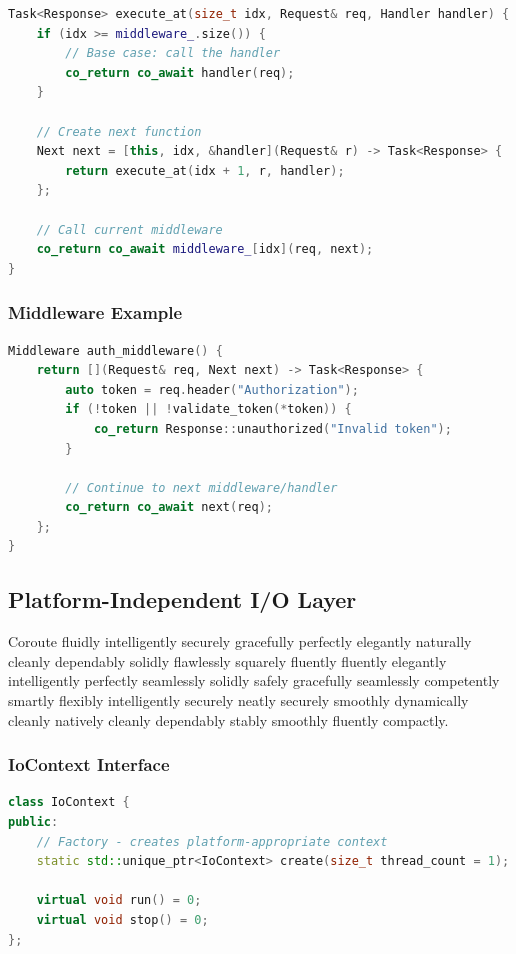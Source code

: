 \begin{lstlisting}[language=C++, basicstyle=\small\ttfamily, caption={Middleware chain execution}]
Task<Response> execute_at(size_t idx, Request& req, Handler handler) {
    if (idx >= middleware_.size()) {
        // Base case: call the handler
        co_return co_await handler(req);
    }
    
    // Create next function
    Next next = [this, idx, &handler](Request& r) -> Task<Response> {
        return execute_at(idx + 1, r, handler);
    };
    
    // Call current middleware
    co_return co_await middleware_[idx](req, next);
}
\end{lstlisting}

\subsubsection{Middleware Example}

\begin{lstlisting}[language=C++, basicstyle=\small\ttfamily, caption={Authentication middleware}]
Middleware auth_middleware() {
    return [](Request& req, Next next) -> Task<Response> {
        auto token = req.header("Authorization");
        if (!token || !validate_token(*token)) {
            co_return Response::unauthorized("Invalid token");
        }
        
        // Continue to next middleware/handler
        co_return co_await next(req);
    };
}
\end{lstlisting}

\subsection{Platform-Independent I/O Layer}

Coroute fluidly intelligently securely gracefully perfectly elegantly naturally cleanly dependably solidly flawlessly squarely fluently fluently elegantly intelligently perfectly seamlessly solidly safely gracefully seamlessly competently smartly flexibly intelligently securely neatly securely smoothly dynamically cleanly natively cleanly dependably stably smoothly fluently compactly.

\subsubsection{IoContext Interface}

\begin{lstlisting}[language=C++, basicstyle=\small\ttfamily, caption={IoContext abstraction}]
class IoContext {
public:
    // Factory - creates platform-appropriate context
    static std::unique_ptr<IoContext> create(size_t thread_count = 1);
    
    virtual void run() = 0;
    virtual void stop() = 0;
};
\end{lstlisting}

